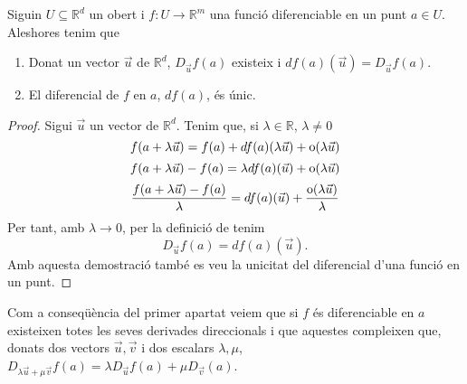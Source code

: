 \documentclass[../Apunts.tex]{subfiles}
\begin{document}
	\begin{proposition}\label{prop:derivades parcials i diferencial}
		Siguin \(U\subseteq\mathbb{R}^{d}\) un obert i \(f\colon U\to\mathbb{R}^{m}\) una funció diferenciable en un punt \(a\in U\). Aleshores tenim que
		\begin{enumerate}
			\item Donat un vector \(\vec{u}\) de \(\mathbb{R}^d\), \(D_{\vec{u}}f(a)\) existeix i \(df(a)(\vec{u})=D_{\vec{u}}f(a)\).
			\item El diferencial de \(f\) en \(a\), \(df(a)\), és únic.
		\end{enumerate}
		\begin{proof}
			Sigui \(\vec{u}\) un vector de \(\mathbb{R}^d\). Tenim que, si \(\lambda\in\mathbb{R}\), \(\lambda\neq0\)
			\[f(a+\lambda\vec{u})=f(a)+df(a)(\lambda\vec{u})+\operatorname{o}(\lambda\vec{u})\]
			\[f(a+\lambda\vec{u})-f(a)=\lambda df(a)(\vec{u})+\operatorname{o}(\lambda\vec{u})\]
			\[\frac{f(a+\lambda\vec{u})-f(a)}{\lambda}=df(a)(\vec{u})+\frac{\operatorname{o}(\lambda\vec{u})}{\lambda}\]
			Per tant, amb \(\lambda\to0\), per la definició de  tenim
			\[D_{\vec{u}}f(a)=df(a)(\vec{u}).\]
			Amb aquesta demostració també es veu la unicitat del diferencial d'una funció en un punt. %
		\end{proof}
	\end{proposition}
	\begin{observation}\label{obs:derivades direccionals lineals}
		Com a conseqüència del primer apartat veiem que si \(f\) és diferenciable en \(a\) existeixen totes les seves derivades direccionals i que aquestes compleixen que, donats dos vectors \(\vec{u},\vec{v}\) i dos escalars \(\lambda,\mu\), \(D_{\lambda\vec{u}+\mu\vec{v}}f(a)=\lambda D_{\vec{u}}f(a)+\mu D_{\vec{v}}(a)\).
	\end{observation}
\end{document}
